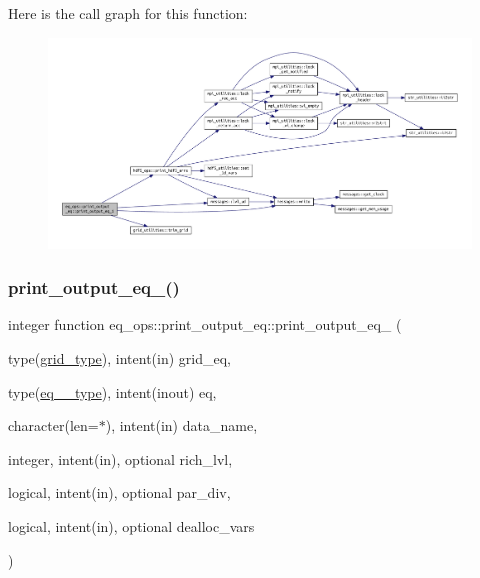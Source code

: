 Here is the call graph for this function\+:\nopagebreak
\begin{figure}[H]
\begin{center}
\leavevmode
\includegraphics[width=350pt]{interfaceeq__ops_1_1print__output__eq_a07fef57b633cc1b723405cb07d12ef24_cgraph}
\end{center}
\end{figure}
\mbox{\label{interfaceeq__ops_1_1print__output__eq_a7efa796c3c3e7cdbcb4fb51c9c6afcac}} 
\subsubsection{\texorpdfstring{print\+\_\+output\+\_\+eq\+\_()}{print\_output\_eq\_2()}}
{\footnotesize\ttfamily integer function eq\+\_\+ops\+::print\+\_\+output\+\_\+eq\+::print\+\_\+output\+\_\+eq\+\_ (\begin{DoxyParamCaption}\item[{type(\hyperlink{structgrid__vars_1_1grid__type}{grid\+\_\+type}), intent(in)}]{grid\+\_\+eq,  }\item[{type(\hyperlink{structeq__vars_1_1eq__2__type}{eq\+\_\+2\+\_\+type}), intent(inout)}]{eq,  }\item[{character(len=$\ast$), intent(in)}]{data\+\_\+name,  }\item[{integer, intent(in), optional}]{rich\+\_\+lvl,  }\item[{logical, intent(in), optional}]{par\+\_\+div,  }\item[{logical, intent(in), optional}]{dealloc\+\_\+vars }\end{DoxyParamCaption})}



